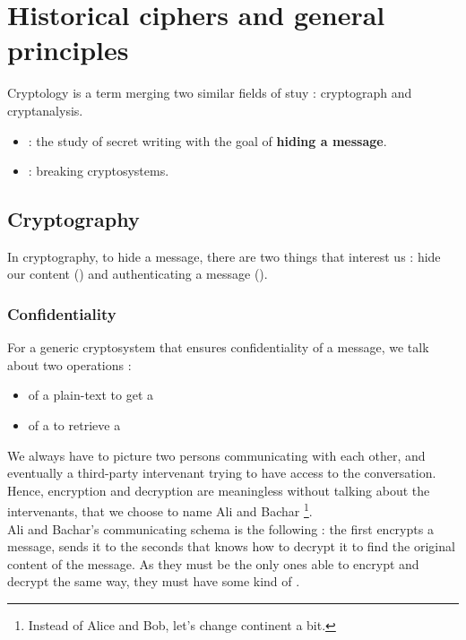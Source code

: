 \documentclass[a4paper, 12pt]{book}
\author{Sami \textsc{Abdul Sater}}
\begin{document}



\tableofcontents

\chapter{Historical ciphers and general principles}
Cryptology is a term merging two similar fields of stuy : cryptograph and cryptanalysis.
\begin{itemize}
    \item {} : the study of secret writing with the goal of \textbf{hiding a message}.
    \item {} : breaking cryptosystems. 
\end{itemize}
\section{Cryptography}
In cryptography, to hide a message, there are two things that interest us : hide our content () and authenticating a message ().

\subsection{Confidentiality}
For a generic cryptosystem that ensures confidentiality of a message, we talk about two operations : 
\begin{itemize}
    \item {} of a plain-text  to get a 
    \item {} of a  to retrieve a 
\end{itemize}

We always have to picture two persons communicating with each other, and eventually a third-party intervenant trying to have access to the conversation. Hence, encryption and decryption are meaningless without talking about the intervenants, that we choose to name Ali and Bachar \footnote{Instead of Alice and Bob, let's change continent a bit.}. \\

Ali and Bachar's communicating schema is the following : the first encrypts a message, sends it to the seconds that knows how to decrypt it to find the original content of the message. As they must be the only ones able to encrypt and decrypt the same way, they must have some kind of .\\
\end{document}

